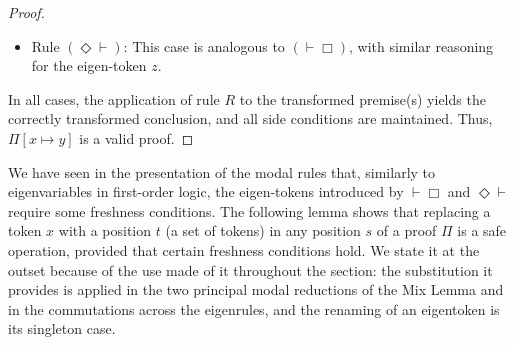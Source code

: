 \documentclass{article}
\newcommand{\seq}[2]{{#1} \vdash{} {#2}}
\newcommand{\pf}[2]{{#1}^{#2}} %
\newcommand{\commento}[1]{}
\theoremstyle{definition}
\begin{document}
{\begin{proof}
\begin{description}
\begin{enumerate}
\begin{itemize}
\begin{enumerate}
                \item If $z \neq x$:
                The eigen-token remains $z$.
                The transformed premise formula is
                $\pf{A}{(s_0,z)[x \mapsto y]} = \pf{A}{s_0[x \mapsto y],z}$.
                The rule application becomes:
                \[
                \AxiomC{$\seq{\Sigma[x \mapsto y]}{\pf{A}{s_0[x \mapsto y],z}, \Lambda[x \mapsto y]}$}
                \RightLabel{$\vdash \Box$}
                \UnaryInfC{$\seq{\Sigma[x \mapsto y]}{\pf{\Box A}{s_0[x \mapsto y]}, \Lambda[x \mapsto y]}$}
                \DisplayProof
                \]
                Side conditions for $z$:
                (a) $z \notin s_0[x \mapsto y]$: Original was $z \notin s_0$. Since $z \neq x$ and $y$ is fresh (so $z \neq y$), the substitution $[x \mapsto y]$ in $s_0$ cannot introduce $z$ if $z$ was not in $s_0$. Thus, this holds.
                (b) $z$ is fresh for $\Sigma[x \mapsto y], \Lambda[x \mapsto y]$: Original was $z$ fresh for $\Sigma, \Lambda$. Since $z \neq x$ and $y$ is fresh (so $z \neq y$), $z$ remains fresh for the transformed contexts.
            \end{enumerate}
            In both subcases, the rule application is valid.

            \item Rule $(\Diamond \vdash)$: This case is analogous to $(\vdash \Box)$, with similar reasoning for the eigen-token $z$.
        \end{itemize}
    \end{enumerate}
\end{description}
In all cases, the application of rule $R$ to the transformed premise(s) yields the correctly transformed conclusion, and all side conditions are maintained. Thus, $\Pi[x \mapsto y]$ is a valid proof.
\end{proof}
}%

We have seen in the presentation of the modal rules that, similarly to
eigenvariables in first-order logic, the eigen-tokens introduced by
$\vdash \Box$ and $\Diamond \vdash$ require some freshness conditions.
The following lemma shows that replacing a token $x$ with a position $t$
(a set of tokens) in any position $s$ of a proof $\Pi$ is a safe operation,
provided that certain freshness conditions hold.
We state it at the outset because of the use made of it throughout the section: the substitution it provides is applied in the two principal modal reductions of the Mix Lemma and in the commutations across the eigenrules, and the renaming of an eigentoken is its singleton case.
\end{document}
